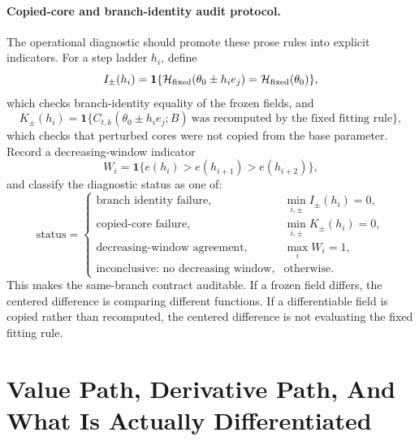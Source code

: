 \paragraph{Copied-core and branch-identity audit protocol.}
The operational diagnostic should promote these prose rules into explicit
indicators.  For a step ladder \(h_i\), define
\begin{equation}
  I_\pm(h_i)=\mathbf{1}\{\mathcal H_{\rm fixed}(\theta_0\pm h_i e_j)=\mathcal H_{\rm fixed}(\theta_0)\},
  \label{eq:bf-hd-ttkr-branch-indicator}
\end{equation}
which checks branch-identity equality of the frozen fields, and
\begin{equation}
  K_\pm(h_i)=\mathbf{1}\{C_{t,k}(\theta_0\pm h_i e_j;B)\ \text{was recomputed by the fixed fitting rule}\},
  \label{eq:bf-hd-ttkr-copied-core-indicator}
\end{equation}
which checks that perturbed cores were not copied from the base parameter.
Record a decreasing-window indicator
\begin{equation}
  W_i=\mathbf{1}\{e(h_i)>e(h_{i+1})>e(h_{i+2})\},
  \label{eq:bf-hd-ttkr-decreasing-window}
\end{equation}
and classify the diagnostic status as one of:
\begin{equation}
\text{status}=
\begin{cases}
\text{branch identity failure},&\min_{i,\pm} I_\pm(h_i)=0,\\
\text{copied-core failure},&\min_{i,\pm} K_\pm(h_i)=0,\\
\text{decreasing-window agreement},&\max_i W_i=1,\\
\text{inconclusive: no decreasing window},&\text{otherwise}.
\end{cases}
  \label{eq:bf-hd-ttkr-fd-status}
\end{equation}
This makes the same-branch contract auditable.  If a frozen field differs, the
centered difference is comparing different functions.  If a differentiable field
is copied rather than recomputed, the centered difference is not evaluating the
fixed fitting rule.

\section{Value Path, Derivative Path, And What Is Actually Differentiated}
\label{sec:bf-hd-derivative-ledger}

